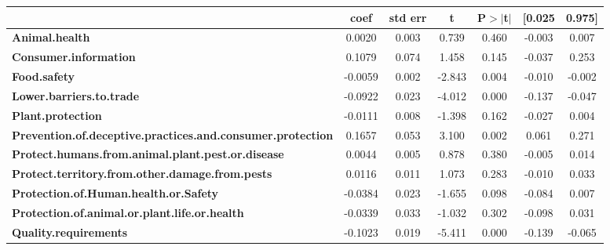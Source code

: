 \begin{center}
\begin{tabular}{lcccccc}
                                                                   & \textbf{coef} & \textbf{std err} & \textbf{t} & \textbf{P$> |$t$|$} & \textbf{[0.025} & \textbf{0.975]}  \\
\midrule
\textbf{Animal.health}                                             &       0.0020  &        0.003     &     0.739  &         0.460        &       -0.003    &        0.007     \\
\textbf{Consumer.information}                                      &       0.1079  &        0.074     &     1.458  &         0.145        &       -0.037    &        0.253     \\
\textbf{Food.safety}                                               &      -0.0059  &        0.002     &    -2.843  &         0.004        &       -0.010    &       -0.002     \\
\textbf{Lower.barriers.to.trade}                                   &      -0.0922  &        0.023     &    -4.012  &         0.000        &       -0.137    &       -0.047     \\
\textbf{Plant.protection}                                          &      -0.0111  &        0.008     &    -1.398  &         0.162        &       -0.027    &        0.004     \\
\textbf{Prevention.of.deceptive.practices.and.consumer.protection} &       0.1657  &        0.053     &     3.100  &         0.002        &        0.061    &        0.271     \\
\textbf{Protect.humans.from.animal.plant.pest.or.disease}          &       0.0044  &        0.005     &     0.878  &         0.380        &       -0.005    &        0.014     \\
\textbf{Protect.territory.from.other.damage.from.pests}            &       0.0116  &        0.011     &     1.073  &         0.283        &       -0.010    &        0.033     \\
\textbf{Protection.of.Human.health.or.Safety}                      &      -0.0384  &        0.023     &    -1.655  &         0.098        &       -0.084    &        0.007     \\
\textbf{Protection.of.animal.or.plant.life.or.health}              &      -0.0339  &        0.033     &    -1.032  &         0.302        &       -0.098    &        0.031     \\
\textbf{Quality.requirements}                                      &      -0.1023  &        0.019     &    -5.411  &         0.000        &       -0.139    &       -0.065     \\

\end{tabular}
\end{center}
